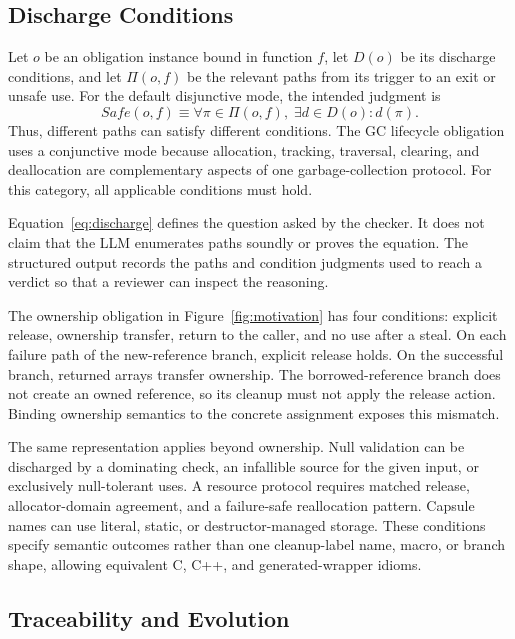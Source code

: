 \subsection{Discharge Conditions}

Let $o$ be an obligation instance bound in function $f$, let $D(o)$ be its
discharge conditions, and let $\Pi(o,f)$ be the relevant paths from its trigger
to an exit or unsafe use. For the default disjunctive mode, the intended
judgment is
\begin{equation}
  \mathit{Safe}(o,f) \equiv
  \forall \pi \in \Pi(o,f),\; \exists d \in D(o): d(\pi).
  \label{eq:discharge}
\end{equation}
Thus, different paths can satisfy different conditions. The GC lifecycle
obligation uses a conjunctive mode because allocation, tracking, traversal, clearing, and
deallocation are complementary aspects of one garbage-collection protocol.
For this category, all applicable conditions must hold.

Equation~\ref{eq:discharge} defines the question asked by the checker. It does
not claim that the LLM enumerates paths soundly or proves the equation. The
structured output records the paths and condition judgments used to reach a
verdict so that a reviewer can inspect the reasoning.

The ownership obligation in Figure~\ref{fig:motivation} has four conditions:
explicit release, ownership transfer, return to the caller, and no use after a
steal. On each failure path of the new-reference branch, explicit release
holds. On the successful branch, returned arrays transfer ownership. The
borrowed-reference branch does not create an owned reference, so its cleanup
must not apply the release action. Binding ownership semantics to the concrete
assignment exposes this mismatch.

The same representation applies beyond ownership. Null validation can be
discharged by a dominating check, an infallible source for the given input, or
exclusively null-tolerant uses. A resource protocol requires matched release,
allocator-domain agreement, and a failure-safe reallocation pattern. Capsule
names can use literal, static, or destructor-managed storage. These conditions
specify semantic outcomes rather than one cleanup-label name, macro, or branch
shape, allowing equivalent C, C++, and generated-wrapper idioms.

\subsection{Traceability and Evolution}

